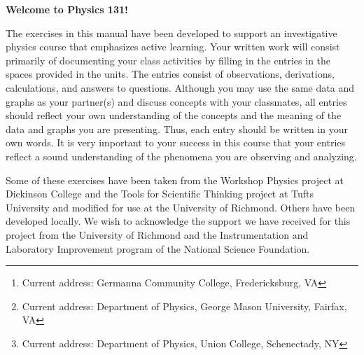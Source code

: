 \author{Matthew G. Belk, Emory F. Bunn, 
Mirela Fetea\footnote{Current address: Germanna Community College, Fredericksburg, VA}, 
Gerard P. Gilfoyle, Henry Nebel, \\
Philip D. Rubin\footnote{Current address: Department of Physics, George Mason University, Fairfax, VA}, 
Jack Singal, Matthew L. Trawick, 
and Michael F. Vineyard\footnote{Current address: Department of Physics, Union College, Schenectady, NY}\\[4pt]
Department of Physics, University of Richmond, VA \\[4pt]
}

\maketitle

\vspace{0.8 in}


\begin{center}
\large{\textbf{Welcome to Physics 131!}}
\end{center}

The exercises in this manual have been developed to support an investigative
physics course that emphasizes active learning. 
Your written work will consist primarily of documenting
your class activities by filling in the entries in the spaces provided
in the units. The entries consist of observations, derivations, calculations,
and answers to questions. Although you may use the same data and graphs
as your partner(s) and discuss concepts with your classmates, all
entries should reflect your own understanding of the concepts and
the meaning of the data and graphs you are presenting. Thus, each
entry should be written in your own words. It is very important
to your success in this course that your entries reflect a sound understanding
of the phenomena you are observing and analyzing. 

Some of these exercises
have been taken from the Workshop Physics project at Dickinson College
and the Tools for Scientific Thinking project at Tufts University
and modified for use at the University of Richmond. Others have been
developed locally. 
We wish to acknowledge the support we have received for this project
from the University of Richmond and the Instrumentation and Laboratory
Improvement program of the National Science Foundation. 


